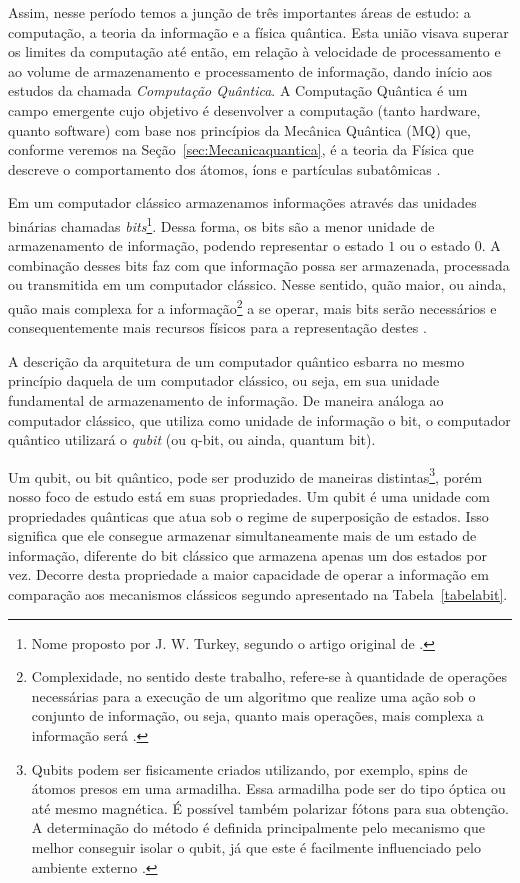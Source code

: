 Assim, nesse período temos a junção de três importantes áreas de estudo: a computação, a teoria da informação e a física quântica. Esta união visava superar os limites da computação até então, em relação à velocidade de processamento e ao volume de armazenamento e processamento de informação, dando início aos estudos da chamada \textit{Computação Quântica}. A Computação Quântica é um campo emergente cujo objetivo é desenvolver a computação (tanto hardware, quanto software) com base nos princípios da Mecânica Quântica (MQ) que, conforme veremos na Seção~\ref{sec:Mecanicaquantica}, é a teoria da Física que descreve o comportamento dos átomos, íons e partículas subatômicas \cite{CompInfoQuantica}.

Em um computador clássico armazenamos informações através das unidades binárias chamadas \textit{bits}\footnote{Nome proposto por J. W. Turkey, segundo o artigo original de \textcite{MTC}.}. Dessa forma, os bits são a menor unidade de armazenamento de informação, podendo representar o estado \(1\) ou o estado \(0\). A combinação desses bits faz com que informação possa ser armazenada, processada ou transmitida em um computador clássico. Nesse sentido, quão maior, ou ainda, quão mais complexa for a informação\footnote{Complexidade, no sentido deste trabalho, refere-se à quantidade de operações necessárias para a execução de um algoritmo que realize uma ação sob o conjunto de informação, ou seja, quanto mais operações, mais complexa a informação será \cite{MTC}.} a se operar, mais bits serão necessários e consequentemente mais recursos físicos para a representação destes \cite{MTC}.

A descrição da arquitetura de um computador quântico esbarra no mesmo princípio daquela de um computador clássico, ou seja, em sua unidade fundamental de armazenamento de informação. De maneira análoga ao computador clássico, que utiliza como unidade de informação o bit, o computador quântico utilizará o \textit{qubit} (ou q-bit, ou ainda, quantum bit).

Um qubit, ou bit quântico, pode ser produzido de maneiras distintas\footnote{Qubits podem ser fisicamente criados utilizando, por exemplo, spins de átomos presos em uma armadilha. Essa armadilha pode ser do tipo óptica ou até mesmo magnética. É possível também polarizar fótons para sua obtenção. A determinação do método é definida principalmente pelo mecanismo que melhor conseguir isolar o qubit, já que este é facilmente influenciado pelo ambiente externo \cite{materialdidaticomecquantica}.}, porém nosso foco de estudo está em suas propriedades. Um qubit é uma unidade com propriedades quânticas que atua sob o regime de superposição de estados. Isso significa que ele consegue armazenar simultaneamente mais de um estado de informação, diferente do bit clássico que armazena apenas um dos estados por vez. Decorre desta propriedade a maior capacidade de operar a informação em comparação aos mecanismos clássicos segundo apresentado na Tabela~\ref{tabelabit}.

